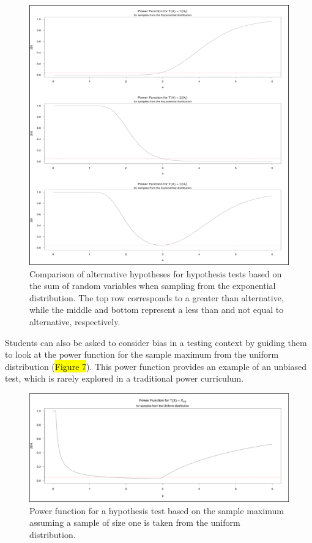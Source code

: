 \documentclass{TISE}
\begin{document}
\begin{figure}[H]
	\centering
	\includegraphics[scale=1]{varyalt1.png}
	\caption{Comparison of alternative hypotheses for hypothesis tests based on the sum of random variables when sampling from the exponential distribution. The top row corresponds to a greater than alternative, while the middle and bottom represent a less than and not equal to alternative, respectively.}
\end{figure}

Students can also be asked to consider bias in a testing context by guiding them to look at the power function for the sample maximum from the uniform distribution (\hl{Figure 7}). This power function provides an example of an unbiased test, which is rarely explored in a traditional power curriculum.

\newpage

\begin{figure}[H]
	\centering
	\includegraphics[width=\linewidth]{varyalt2.png}
	\caption{Power function for a hypothesis test based on the sample maximum assuming a sample of size one is taken from the uniform distribution.}
\end{figure}
\end{document}
